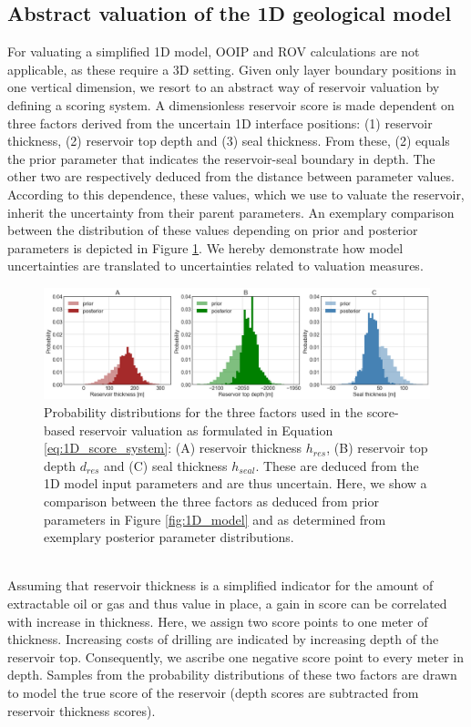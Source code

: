 	        \subsection{Abstract valuation of the 1D geological model}\label{sec:1D_score_system}
	        For valuating a simplified 1D model, OOIP and ROV calculations are not applicable, as these require a 3D setting. Given only layer boundary positions in one vertical dimension, we resort to an abstract way of reservoir valuation by defining a scoring system. A dimensionless reservoir score is made dependent on three factors derived from the uncertain 1D interface positions: (1) reservoir thickness, (2) reservoir top depth and (3) seal thickness. From these, (2) equals the prior parameter that indicates the reservoir-seal boundary in depth. The other two are respectively deduced from the distance between parameter values. According to this dependence, these values, which we use to valuate the reservoir, inherit the uncertainty from their parent parameters. An exemplary comparison between the distribution of these values depending on prior and posterior parameters is depicted in Figure \ref{fig:3_parameters}. We hereby demonstrate how model uncertainties are translated to uncertainties related to valuation measures.
	        \begin{figure}[h]
	        	\centering
	        	\includegraphics[width=1\textwidth]{Figures/3_parameters.png}
	        	\caption{Probability distributions for the three factors used in the score-based reservoir valuation as formulated in Equation \ref{eq:1D_score_system}: (A) reservoir thickness $h_{res}$, (B) reservoir top depth $d_{res}$ and (C) seal thickness $h_{seal}$. These are deduced from the 1D model input parameters and are thus uncertain. Here, we show a comparison between the three factors as deduced from prior parameters in Figure \ref{fig:1D_model} and as determined from exemplary posterior parameter distributions.}\label{fig:3_parameters}
	        \end{figure}\\
	        Assuming that reservoir thickness is a simplified indicator for the amount of extractable oil or gas and thus value in place, a gain in score can be correlated with increase in thickness. Here, we assign two score points to one meter of thickness. Increasing costs of drilling are indicated by increasing depth of the reservoir top. Consequently, we ascribe one negative score point to every meter in depth. Samples from the probability distributions of these two factors are drawn to model the true score of the reservoir (depth scores are subtracted from reservoir thickness scores).
